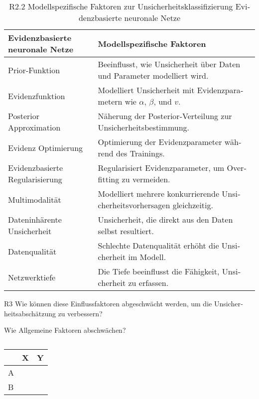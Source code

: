 \begin{otherlanguage}{ngerman}
\begin{table}[!htpb]
  \centering
  \begin{tabular}{|l|p{\dimexpr\textwidth-8cm-2\tabcolsep}|}
    \hline
    \textbf{\gls{Evidenzbasierte neuronale Netze}} & \textbf{Modellspezifische Faktoren} \\
    \hline
    Prior-Funktion & Beeinflusst, wie Unsicherheit über Daten und Parameter modelliert wird. \\
    \hline
    Evidenzfunktion & Modelliert Unsicherheit mit Evidenzparametern wie \( \alpha \), \( \beta \), und \( v \). \\
    \hline
    Posterior Approximation & Näherung der Posterior-Verteilung zur Unsicherheitsbestimmung. \\
    \hline
    Evidenz Optimierung & Optimierung der Evidenzparameter während des Trainings. \\
    \hline
    Evidenzbasierte Regularisierung & Regularisiert Evidenzparameter, um Overfitting zu vermeiden. \\
    \hline
    Multimodalität & Modelliert mehrere konkurrierende Unsicherheitsvorhersagen gleichzeitig. \\
    \hline
    Dateninhärente Unsicherheit & Unsicherheit, die direkt aus den Daten selbst resultiert. \\
    \hline
    Datenqualität & Schlechte Datenqualität erhöht die Unsicherheit im Modell. \\
    \hline
    Netzwerktiefe & Die Tiefe beeinflusst die Fähigkeit, Unsicherheit zu erfassen. \\
    \hline
  \end{tabular}
  \caption{R2.2 Modellspezifische Faktoren zur Unsicherheitsklassifizierung \gls{Evidenzbasierte neuronale Netze}}\label{tab:chapter6r23}
\end{table}




R3 Wie können diese Einflussfaktoren abgeschwächt werden, um die Unsicherheitsabschätzung zu verbessern?

\newline
Wie Allgemeine Faktoren abschwächen?

\begin{table}[!htpb]
  \centering
  \begin{tabular}{|l|l|p{\dimexpr\textwidth-8cm-2\tabcolsep}|}  %
    \hline
    & \textbf{X} & \textbf{Y} \\
    \hline
    A & & \\
    \hline
    B & & \\
    \hline
  \end{tabular}
  \caption{}\label{tab:chapter6r31}
\end{table}


\end{otherlanguage}
